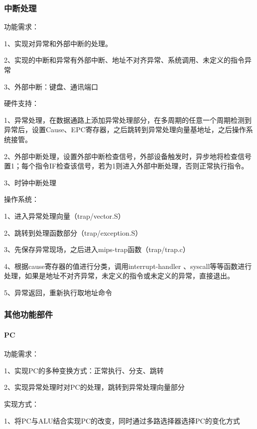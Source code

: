 \documentclass[12pt,a4paper]{article}
\begin{document}
\begin{CJK}{UTF8}{gbsn}
		\subsubsection{中断处理}
			\begin{description*}
				\setlength{\itemsep}{1pt}
				\item[\quad 功能需求：]\hfill\par
					1、实现对异常和外部中断的处理。\par
					2、实现的中断和异常有外部中断、地址不对齐异常、系统调用、未定义的指令异常\par
					3、外部中断：键盘、通讯端口
				\item[\quad 硬件支持：]\hfill\par
					1、异常处理，在数据通路上添加异常处理部分，在多周期的任意一个周期检测到异常后，设置Cause、EPC寄存器，之后跳转到异常处理向量基地址，之后操作系统接管。\par
					2、外部中断处理，设置外部中断检查信号，外部设备触发时，异步地将检查信号置1；每个指令IF检查该信号，若为1则进入外部中断处理，否则正常执行指令。\par
					3、时钟中断处理
				\item[\quad 操作系统：]\hfill\par
					1、进入异常处理向量（trap/vector.S）\par
					2、跳转到处理函数部分（trap/exception.S）\par
					3、先保存异常现场，之后进入mips-trap函数（trap/trap.c）\par
					4、根据cause寄存器的值进行分类，调用interrupt-handler 、syscall等等函数进行处理，如果是地址不对齐异常，未定义的指令或未定义的异常，直接退出。\par
					5、异常返回，重新执行取地址命令
			\end{description*}

		\subsubsection{其他功能部件}
			\paragraph{PC}
				\begin{description*}
					\setlength{\itemsep}{2pt}
					\item[\quad 功能需求：]\hfill\par
						1、实现PC的多种变换方式：正常执行、分支、跳转\par
						2、实现异常处理时对PC的处理，跳转到异常处理向量部分
					\item[\quad 实现方式：]\hfill\par
						1、将PC与ALU结合实现PC的改变，同时通过多路选择器选择PC的变化方式
				\end{description*}


\end{CJK}
\end{document}
